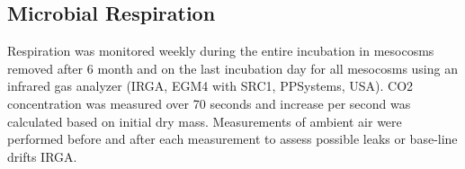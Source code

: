 \documentclass[authoryear,preprint,review,12pt]{elsarticle}
\begin{document}
                                                                                                                                                                                                                                                                                                                                                                                                                                                                                                                                                                                                                                                                                                                                                                                                                                                                                                                                                                                                                                                                                                                              \subsection{Microbial Respiration}
                                                                                                                                                                                                                                                                                                                                                                                                                                                                                                                                                                                                                                                                                                                                                                                                                                                                                                                                                                                                                                                                                                                              Respiration was monitored weekly during the entire incubation in mesocosms removed after 6 month and on the last incubation day for all mesocosms using an infrared gas analyzer (IRGA, EGM4 with SRC1, PPSystems, USA). CO2 concentration was measured over 70 seconds and increase per second was calculated based on initial dry mass. Measurements of ambient air were performed before and after each measurement to assess possible leaks or base-line drifts IRGA. %
\end{document}
